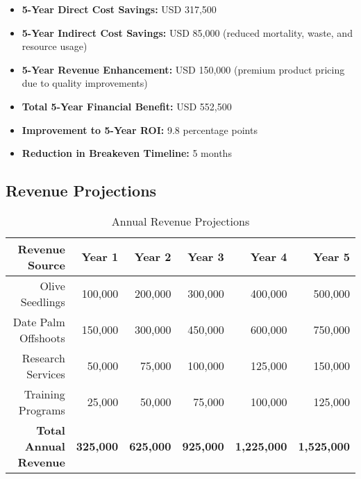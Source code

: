 \begin{itemize}
    \item \textbf{5-Year Direct Cost Savings:} USD 317,500
    \item \textbf{5-Year Indirect Cost Savings:} USD 85,000 (reduced mortality, waste, and resource usage)
    \item \textbf{5-Year Revenue Enhancement:} USD 150,000 (premium product pricing due to quality improvements)
    \item \textbf{Total 5-Year Financial Benefit:} USD 552,500
    \item \textbf{Improvement to 5-Year ROI:} 9.8 percentage points
    \item \textbf{Reduction in Breakeven Timeline:} 5 months
\end{itemize}

\subsection{Revenue Projections}

\begin{table}[h]
\centering
\begin{tabular}{|r|r|r|r|r|r|}
\hline
\textbf{Revenue Source} & \textbf{Year 1} & \textbf{Year 2} & \textbf{Year 3} & \textbf{Year 4} & \textbf{Year 5} \\
\hline
Olive Seedlings & 100,000 & 200,000 & 300,000 & 400,000 & 500,000 \\
Date Palm Offshoots & 150,000 & 300,000 & 450,000 & 600,000 & 750,000 \\
Research Services & 50,000 & 75,000 & 100,000 & 125,000 & 150,000 \\
Training Programs & 25,000 & 50,000 & 75,000 & 100,000 & 125,000 \\
\hline
\textbf{Total Annual Revenue} & \textbf{325,000} & \textbf{625,000} & \textbf{925,000} & \textbf{1,225,000} & \textbf{1,525,000} \\
\hline
\end{tabular}
\caption{Annual Revenue Projections}
\end{table}


